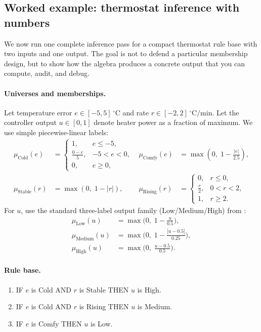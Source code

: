 \subsection{Worked example: thermostat inference with numbers}
\label{sec:fuzzyinference_worked_example_thermostat_inference_with_numbers}

We now run one complete inference pass for a compact thermostat rule base with two inputs and one output. The goal is not to defend a particular membership design, but to show how the algebra produces a concrete output that you can compute, audit, and debug.

\paragraph{Universes and memberships.}
Let temperature error \(e \in [-5,5]\,^\circ\mathrm{C}\) and rate \(r \in [-2,2]\,^\circ\mathrm{C}/\mathrm{min}\). Let the controller output \(u \in [0,1]\) denote heater power as a fraction of maximum.
We use simple piecewise-linear labels:
\begin{align*}
    \mu_{\text{Cold}}(e) &=
    \begin{cases}
        1, & e \le -5,\\
        \frac{0-e}{5}, & -5 < e < 0,\\
        0, & e \ge 0,
    \end{cases}
    &
    \mu_{\text{Comfy}}(e) &= \max\!\left(0,\; 1-\frac{|e|}{2.5}\right),\\
    \mu_{\text{Stable}}(r) &= \max\!\left(0,\; 1-|r|\right),
    &
    \mu_{\text{Rising}}(r) &=
    \begin{cases}
        0, & r \le 0,\\
        \frac{r}{2}, & 0 < r < 2,\\
        1, & r \ge 2.
    \end{cases}
\end{align*}
For \(u\), use the standard three-label output family (Low/Medium/High) from :
\begin{align*}
    \mu_{\text{Low}}(u) &= \max\!\Big(0,\; 1-\tfrac{u}{0.5}\Big),\\
    \mu_{\text{Medium}}(u) &= \max\!\Big(0,\; 1-\tfrac{|u-0.5|}{0.25}\Big),\\
    \mu_{\text{High}}(u) &= \max\!\Big(0,\; \tfrac{u-0.5}{0.5}\Big).
\end{align*}

\paragraph{Rule base.}
\begin{enumerate}
    \item IF \(e\) is Cold AND \(r\) is Stable THEN \(u\) is High.
    \item IF \(e\) is Cold AND \(r\) is Rising THEN \(u\) is Medium.
    \item IF \(e\) is Comfy THEN \(u\) is Low.
\end{enumerate}

